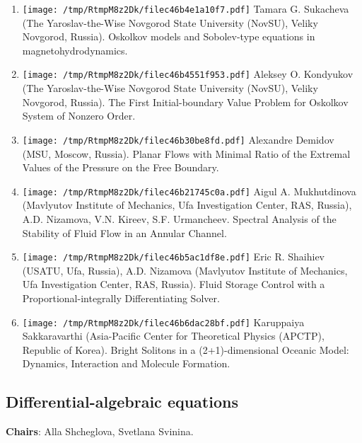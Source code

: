 \documentclass[
]{article}
\providecommand{\tightlist}{%
  \setlength{\itemsep}{0pt}\setlength{\parskip}{0pt}}
\begin{document}
\begin{enumerate}
\def\labelenumi{\arabic{enumi}.}
\tightlist
\item
  \protect\texttt{[image: /tmp/RtmpM8z2Dk/filec46b4e1a10f7.pdf]}
  Tamara G. Sukacheva (The Yaroslav-the-Wise Novgorod State University
  (NovSU), Veliky Novgorod, Russia). Oskolkov models and Sobolev-type
  equations in magnetohydrodynamics.
\item
  \protect\texttt{[image: /tmp/RtmpM8z2Dk/filec46b4551f953.pdf]}
  Aleksey O. Kondyukov (The Yaroslav-the-Wise Novgorod State University
  (NovSU), Veliky Novgorod, Russia). The First Initial-boundary Value
  Problem for Oskolkov System of Nonzero Order.
\item
  \protect\texttt{[image: /tmp/RtmpM8z2Dk/filec46b30be8fd.pdf]}
  Alexandre Demidov (MSU, Moscow, Russia). Planar Flows with Minimal
  Ratio of the Extremal Values of the Pressure on the Free Boundary.
\item
  \protect\texttt{[image: /tmp/RtmpM8z2Dk/filec46b21745c0a.pdf]}
  Aigul A. Mukhutdinova (Mavlyutov Institute of Mechanics, Ufa
  Investigation Center, RAS, Russia), A.D. Nizamova, V.N. Kireev, S.F.
  Urmancheev. Spectral Analysis of the Stability of Fluid Flow in an
  Annular Channel.
\item
  \protect\texttt{[image: /tmp/RtmpM8z2Dk/filec46b5ac1df8e.pdf]}
  Eric R. Shaihiev (USATU, Ufa, Russia), A.D. Nizamova (Mavlyutov
  Institute of Mechanics, Ufa Investigation Center, RAS, Russia). Fluid
  Storage Control with a Proportional-integrally Differentiating Solver.
\item
  \protect\texttt{[image: /tmp/RtmpM8z2Dk/filec46b6dac28bf.pdf]}
  Karuppaiya Sakkaravarthi (Asia-Pacific Center for Theoretical Physics
  (APCTP), Republic of Korea). Bright Solitons in a (2+1)-dimensional
  Oceanic Model: Dynamics, Interaction and Molecule Formation.
\end{enumerate}

\hypertarget{dae}{%
\subsection{Differential-algebraic equations}\label{dae}}

\textbf{Chairs}: Alla Shcheglova, Svetlana Svinina.
\end{document}
